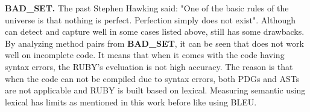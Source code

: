 \textbf{BAD\_SET.} The past Stephen Hawking said: "One of the basic rules of the universe is that nothing is perfect. Perfection simply does not exist". Although {\model} can detect and capture well in some cases listed above, {\model} still has some drawbacks. By analyzing method pairs from \textbf{BAD\_SET}, it can be seen that {\model} does not work well on incomplete code. It means that when it comes with the code having syntax errors, the RUBY's eveluation is not high accuracy. The reason is that when the code can not be compiled due to syntax errors, both PDGs and ASTs are not applicable and RUBY is built based on lexical. Measuring semantic using lexical has limits as mentioned in this work before like using BLEU. 


%
%
